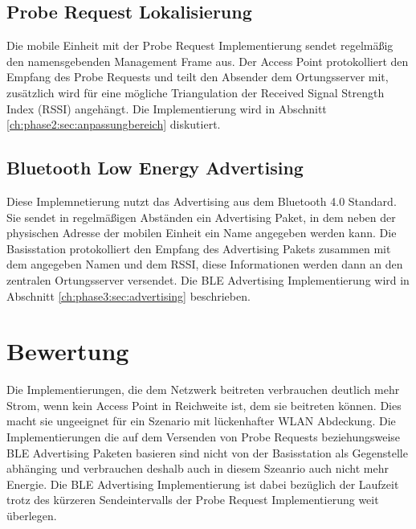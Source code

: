\subsection{Probe Request Lokalisierung}
Die mobile Einheit mit der Probe Request Implementierung sendet regelmäßig den namensgebenden Management Frame aus.
Der Access Point protokolliert den Empfang des Probe Requests und teilt den Absender dem Ortungsserver mit, zusätzlich wird für eine mögliche Triangulation der Received Signal Strength Index (RSSI) angehängt.
Die Implementierung wird in Abschnitt \ref{ch:phase2:sec:anpassungbereich} diskutiert.

\subsection{Bluetooth Low Energy Advertising}
\label{ch:realworld:sec:ble}
Diese Implemnetierung nutzt das Advertising aus dem Bluetooth 4.0 Standard.
Sie sendet in regelmäßigen Abständen ein Advertising Paket, in dem neben der physischen Adresse der mobilen Einheit ein Name angegeben werden kann.
Die Basisstation protokolliert den Empfang des Advertising Pakets zusammen mit dem angegeben Namen und dem RSSI, diese Informationen werden dann an den zentralen Ortungsserver versendet.
Die BLE Advertising Implementierung wird in Abschnitt \ref{ch:phase3:sec:advertising} beschrieben.

\section{Bewertung}
Die Implementierungen, die dem Netzwerk beitreten verbrauchen deutlich mehr Strom, wenn kein Access Point in Reichweite ist, dem sie beitreten können.
Dies macht sie ungeeignet für ein Szenario mit lückenhafter WLAN Abdeckung.
Die Implementierungen die auf dem Versenden von Probe Requests beziehungsweise BLE Advertising Paketen basieren sind nicht von der Basisstation als Gegenstelle abhänging und verbrauchen deshalb auch in diesem Szeanrio auch nicht mehr Energie.
Die BLE Advertising Implementierung ist dabei bezüglich der Laufzeit trotz des kürzeren Sendeintervalls der Probe Request Implementierung weit überlegen.
